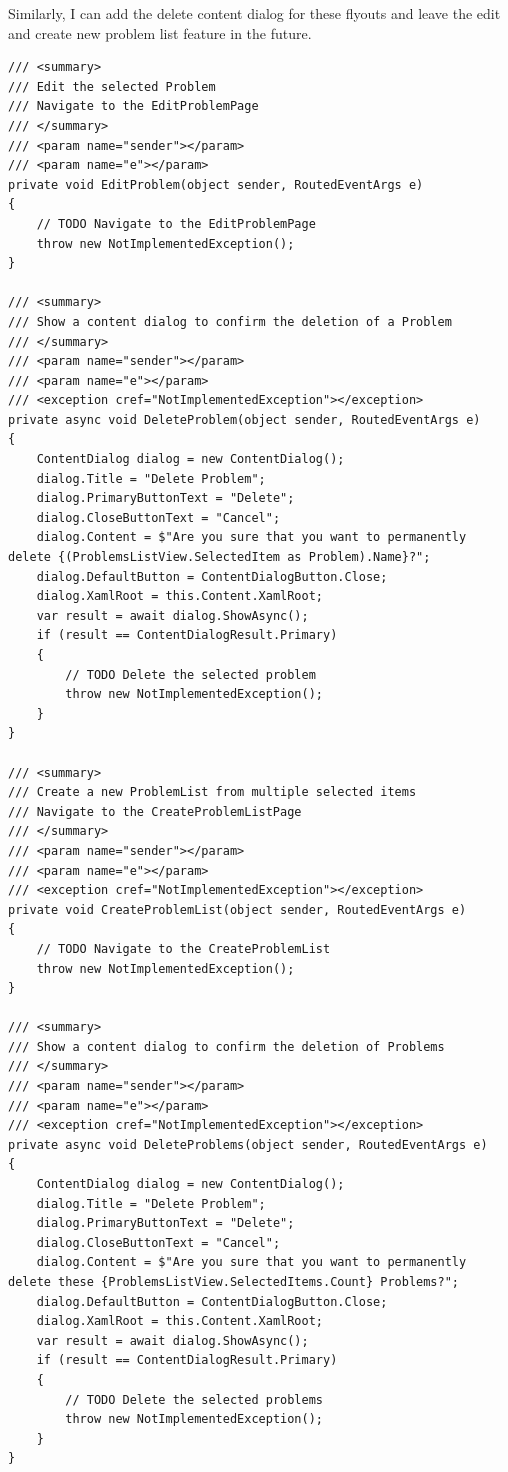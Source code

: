 \documentclass[a4paper]{report}
\begin{document}
Similarly, I can add the delete content dialog for these flyouts and leave the edit and create new problem list feature in the future.

\begin{verbatim}
/// <summary>
/// Edit the selected Problem
/// Navigate to the EditProblemPage
/// </summary>
/// <param name="sender"></param>
/// <param name="e"></param>
private void EditProblem(object sender, RoutedEventArgs e)
{
    // TODO Navigate to the EditProblemPage
    throw new NotImplementedException();
}

/// <summary>
/// Show a content dialog to confirm the deletion of a Problem
/// </summary>
/// <param name="sender"></param>
/// <param name="e"></param>
/// <exception cref="NotImplementedException"></exception>
private async void DeleteProblem(object sender, RoutedEventArgs e)
{
    ContentDialog dialog = new ContentDialog();
    dialog.Title = "Delete Problem";
    dialog.PrimaryButtonText = "Delete";
    dialog.CloseButtonText = "Cancel";
    dialog.Content = $"Are you sure that you want to permanently delete {(ProblemsListView.SelectedItem as Problem).Name}?";
    dialog.DefaultButton = ContentDialogButton.Close;
    dialog.XamlRoot = this.Content.XamlRoot;
    var result = await dialog.ShowAsync();
    if (result == ContentDialogResult.Primary)
    {
        // TODO Delete the selected problem
        throw new NotImplementedException();
    }
}

/// <summary>
/// Create a new ProblemList from multiple selected items
/// Navigate to the CreateProblemListPage
/// </summary>
/// <param name="sender"></param>
/// <param name="e"></param>
/// <exception cref="NotImplementedException"></exception>
private void CreateProblemList(object sender, RoutedEventArgs e)
{
    // TODO Navigate to the CreateProblemList
    throw new NotImplementedException();
}

/// <summary>
/// Show a content dialog to confirm the deletion of Problems
/// </summary>
/// <param name="sender"></param>
/// <param name="e"></param>
/// <exception cref="NotImplementedException"></exception>
private async void DeleteProblems(object sender, RoutedEventArgs e)
{
    ContentDialog dialog = new ContentDialog();
    dialog.Title = "Delete Problem";
    dialog.PrimaryButtonText = "Delete";
    dialog.CloseButtonText = "Cancel";
    dialog.Content = $"Are you sure that you want to permanently delete these {ProblemsListView.SelectedItems.Count} Problems?";
    dialog.DefaultButton = ContentDialogButton.Close;
    dialog.XamlRoot = this.Content.XamlRoot;
    var result = await dialog.ShowAsync();
    if (result == ContentDialogResult.Primary)
    {
        // TODO Delete the selected problems
        throw new NotImplementedException();
    }
}
\end{verbatim}
\end{document}

